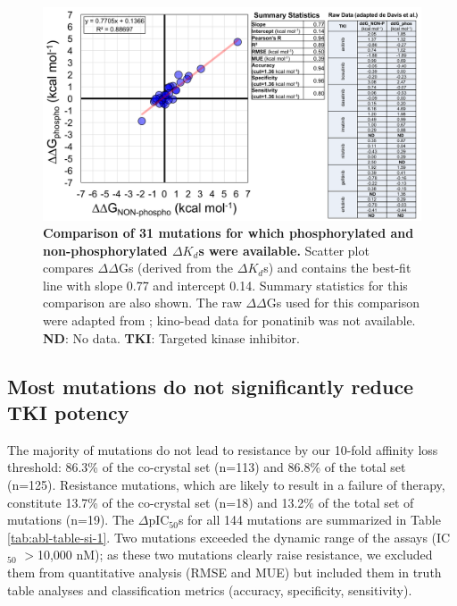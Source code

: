 \documentclass[phd,tocprelim]{cornell}
\begin{document}
\begin{landscape}
	\begin{figure}[p]
		\centering
		\includegraphics[width=0.8\linewidth]{figures/abl-supplementary-figure-1.pdf}
		\caption[Comparison of 31 mutations for which phosphorylated and non-phosphorylated $\Delta K_{d}$s were available.]{
			{\bf Comparison of 31 mutations for which phosphorylated and non-phosphorylated $\Delta K_{d}$s were available.}
			Scatter plot compares $\Delta\Delta$Gs (derived from the $\Delta K_{d}$s) and contains the best-fit line with slope 0.77 and intercept 0.14. Summary statistics for this comparison are also shown. The raw $\Delta\Delta$Gs used for this comparison were adapted from \protect\cite{Davis:Nat.Biotechnol.:2011}; kino-bead data for ponatinib was not available. \textbf{ND}: No data. \textbf{TKI}: Targeted kinase inhibitor.
		}
		\label{fig:abl-figure-si-1}
	\end{figure}
\end{landscape}

\subsection{Most mutations do not significantly reduce TKI potency}
The majority of mutations do not lead to resistance by our 10-fold affinity loss threshold: 86.3\% of the co-crystal set (n=113) and 86.8\% of the total set (n=125).
Resistance mutations, which are likely to result in a failure of therapy, constitute 13.7\% of the co-crystal set (n=18) and 13.2\% of the total set of mutations (n=19).
The $\Delta$pIC$_{50}$s for all 144 mutations are summarized in Table \ref{tab:abl-table-si-1}. %
Two mutations exceeded the dynamic range of the assays (IC$_{50}$ $>$10,000 nM); as these two mutations clearly raise resistance, we excluded them from quantitative analysis (RMSE and MUE) but included them in truth table analyses and classification metrics (accuracy, specificity, sensitivity).
\end{document}
